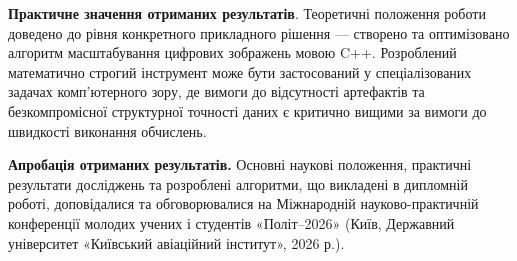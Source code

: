 \textbf{Практичне значення отриманих результатів}. Теоретичні положення роботи доведено до рівня конкретного прикладного рішення — створено та оптимізовано алгоритм масштабування цифрових зображень мовою C++. Розроблений математично строгий інструмент може бути застосований у спеціалізованих задачах комп'ютерного зору, де вимоги до відсутності артефактів та безкомпромісної структурної точності даних є критично вищими за вимоги до швидкості виконання обчислень.

\textbf{Апробація отриманих результатів.} Основні наукові положення, практичні результати досліджень та розроблені алгоритми, що викладені в дипломній роботі, доповідалися та обговорювалися на Міжнародній науково-практичній конференції молодих учених і студентів «Політ--2026» (Київ, Державний університет «Київський авіаційний інститут», 2026 р.).
\newpage
